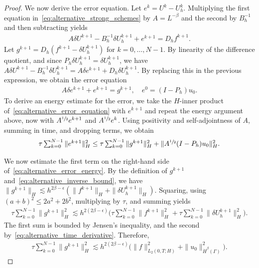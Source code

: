 \documentclass[numbers,webpdf]{ima-authoring-template}%
\theoremstyle{thmstyletwo}%
\numberwithin{equation}{section}
\begin{document}
\begin{proof}
    We now derive the error equation. Let $e^k = U^{k}-U_h^{k}$. Multiplying the first equation in~\eqref{eq:alternative_strong_schemes} by $A=L^{-\beta}$ and the second by $B_h^{-1}$ and then subtracting yields
    \begin{align*}
    A\delta U^{k+1}-B_h^{-1}\delta U_h^{k+1}+e^{k+1}
    =D_hf^{k+1}.
    \end{align*}
    Let $g^{k+1}=D_h(f^{k+1}-\delta U_h^{k+1})$ for $k=0,\ldots,N-1$. By linearity of the difference quotient, and since $P_h\delta U_h^{k+1}=\delta U_h^{k+1}$, we have $A\delta U^{k+1}-B_h^{-1}\delta U_h^{k+1}
    =A\delta e^{k+1}+D_h\delta U_h^{k+1}$. By replacing this in the previous expression, we obtain the error equation
    \begin{align}
    \label{eq:alternative_error_equation}
    A\delta e^{k+1}+e^{k+1}=g^{k+1},\quad e^0=(I-P_h)u_0.
    \end{align}
    To derive an energy estimate for the error, we take the $H$-inner product of~\eqref{eq:alternative_error_equation} with $e^{k+1}$ and repeat the energy argument above, now with $A^{\sfrac12}e^{k+1}$ and $A^{\sfrac12}e^k$. Using positivity and self-adjointness of $A$, summing in time, and dropping terms, we obtain 
    \begin{align} 
    \label{eq:alternative_error_energy}
    \textstyle
    \tau\sum_{k=0}^{N-1}\|e^{k+1}\|_H^2
    \leq\tau\sum_{k=0}^{N-1}\|g^{k+1}\|_H^2+\|A^{\sfrac12}(I-P_h)u_0\|_H^2.
    \end{align}
    
    We now estimate the first term on the right-hand side of~\eqref{eq:alternative_error_energy}. By the definition of $g^{k+1}$ and~\eqref{eq:alternative_inverse_bound}, we have $\|g^{k+1}\|_H \lesssim h^{2\beta-\epsilon} \left(\|f^{k+1}\|_H+\|\delta U_h^{k+1}\|_H\right)$. Squaring, using $(a+b)^2\leq2a^2+2b^2$, multiplying by $\tau$, and summing yields
    \begin{align*}
    \textstyle
    \tau\sum_{k=0}^{N-1}\|g^{k+1}\|_H^2
    \lesssim h^{2(2\beta-\epsilon)}
    \big(\tau\sum_{k=0}^{N-1}\|f^{k+1}\|_H^2
    +\tau\sum_{k=0}^{N-1}\|\delta U_h^{k+1}\|_H^2\big).
    \end{align*}
    The first sum is bounded by Jensen's inequality, and the second by~\eqref{eq:alternative_time_derivative}. Therefore,
    \begin{align}
    \label{eq:alternative_forcing_bound}
    \textstyle
    \tau\sum_{k=0}^{N-1}\|g^{k+1}\|_H^2
    \lesssim h^{2(2\beta-\epsilon)}
    \big(\|f\|_{L_2(0,T;H)}^2+\|u_0\|_{\dot H^\beta(\Gamma)}^2\big).
    \end{align}


\end{proof}
\end{document}
